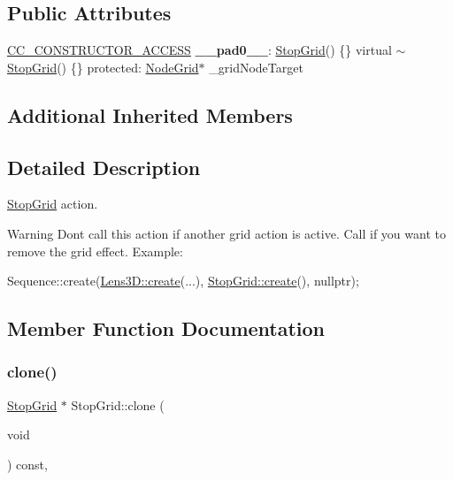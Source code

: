 \subsection*{Public Attributes}
\begin{DoxyCompactItemize}
\item 
\mbox{\label{classStopGrid_aa2dbee7a6ec3712cc32ce542ecf42164}} 
\hyperlink{_2cocos2d_2cocos_2base_2ccConfig_8h_a25ef1314f97c35a2ed3d029b0ead6da0}{C\+C\+\_\+\+C\+O\+N\+S\+T\+R\+U\+C\+T\+O\+R\+\_\+\+A\+C\+C\+E\+SS} {\bfseries \+\_\+\+\_\+pad0\+\_\+\+\_\+}\+: \hyperlink{classStopGrid}{Stop\+Grid}() \{\} virtual $\sim$\hyperlink{classStopGrid}{Stop\+Grid}() \{\} protected\+: \hyperlink{classNodeGrid}{Node\+Grid}$\ast$ \+\_\+grid\+Node\+Target
\end{DoxyCompactItemize}
\subsection*{Additional Inherited Members}


\subsection{Detailed Description}
\hyperlink{classStopGrid}{Stop\+Grid} action. 

\begin{DoxyWarning}{Warning}
Don\textquotesingle{}t call this action if another grid action is active. Call if you want to remove the grid effect. Example\+: 
\begin{DoxyCode}
Sequence::create(\hyperlink{classLens3D_a6c604a8898ada07ab564bcd596f32b7d}{Lens3D::create}(...), \hyperlink{classStopGrid_a75cbdf91c486614067c28d051eddafd0}{StopGrid::create}(), \textcolor{keyword}{nullptr});
\end{DoxyCode}
 
\end{DoxyWarning}


\subsection{Member Function Documentation}
\mbox{\label{classStopGrid_a3ab7a499f088f1ef4ce41a4131761bbf}} 
\subsubsection{\texorpdfstring{clone()}{clone()}\hspace{0.1cm}{\footnotesize\ttfamily [1/2]}}
{\footnotesize\ttfamily \hyperlink{classStopGrid}{Stop\+Grid} $\ast$ Stop\+Grid\+::clone (\begin{DoxyParamCaption}\item[{void}]{ }\end{DoxyParamCaption}) const\hspace{0.3cm}{\ttfamily [override]}, {\ttfamily [virtual]}}

